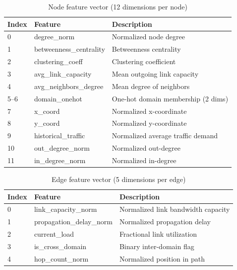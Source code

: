 \documentclass[12pt]{article}
\begin{document}
\begin{table}[h]
\centering
\caption{Node feature vector (12 dimensions per node)}
\begin{tabular}{lll}
\toprule
\textbf{Index} & \textbf{Feature} & \textbf{Description} \\
\midrule
0 & degree\_norm & Normalized node degree \\
1 & betweenness\_centrality & Betweenness centrality \\
2 & clustering\_coeff & Clustering coefficient \\
3 & avg\_link\_capacity & Mean outgoing link capacity \\
4 & avg\_neighbors\_degree & Mean degree of neighbors \\
5--6 & domain\_onehot & One-hot domain membership (2 dims) \\
7 & x\_coord & Normalized x-coordinate \\
8 & y\_coord & Normalized y-coordinate \\
9 & historical\_traffic & Normalized average traffic demand \\
10 & out\_degree\_norm & Normalized out-degree \\
11 & in\_degree\_norm & Normalized in-degree \\
\bottomrule
\end{tabular}
\end{table}

\begin{table}[h]
\centering
\caption{Edge feature vector (5 dimensions per edge)}
\begin{tabular}{lll}
\toprule
\textbf{Index} & \textbf{Feature} & \textbf{Description} \\
\midrule
0 & link\_capacity\_norm & Normalized link bandwidth capacity \\
1 & propagation\_delay\_norm & Normalized propagation delay \\
2 & current\_load & Fractional link utilization \\
3 & is\_cross\_domain & Binary inter-domain flag \\
4 & hop\_count\_norm & Normalized position in path \\
\bottomrule
\end{tabular}
\end{table}
\end{document}
